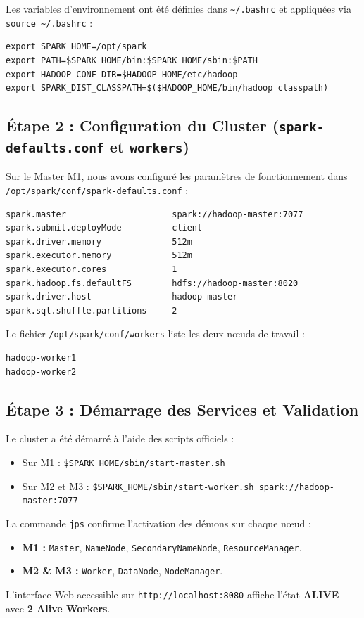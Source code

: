 \documentclass[11pt,a4paper]{article}
\begin{document}
Les variables d'environnement ont été définies dans \texttt{\textasciitilde/.bashrc} et appliquées via \texttt{source \textasciitilde/.bashrc} :
\begin{lstlisting}[style=custombash]
export SPARK_HOME=/opt/spark
export PATH=$SPARK_HOME/bin:$SPARK_HOME/sbin:$PATH
export HADOOP_CONF_DIR=$HADOOP_HOME/etc/hadoop
export SPARK_DIST_CLASSPATH=$($HADOOP_HOME/bin/hadoop classpath)
\end{lstlisting}

\subsection{Étape 2 : Configuration du Cluster (\texttt{spark-defaults.conf} et \texttt{workers})}
Sur le Master M1, nous avons configuré les paramètres de fonctionnement dans \texttt{/opt/spark/conf/spark-defaults.conf} :
\begin{lstlisting}[style=custombash]
spark.master                     spark://hadoop-master:7077
spark.submit.deployMode          client
spark.driver.memory              512m
spark.executor.memory            512m
spark.executor.cores             1
spark.hadoop.fs.defaultFS        hdfs://hadoop-master:8020
spark.driver.host                hadoop-master
spark.sql.shuffle.partitions     2
\end{lstlisting}

Le fichier \texttt{/opt/spark/conf/workers} liste les deux nœuds de travail :
\begin{lstlisting}[style=custombash]
hadoop-worker1
hadoop-worker2
\end{lstlisting}

\subsection{Étape 3 : Démarrage des Services et Validation}
Le cluster a été démarré à l'aide des scripts officiels :
\begin{itemize}
    \item Sur M1 : \texttt{\$SPARK\_HOME/sbin/start-master.sh}
    \item Sur M2 et M3 : \texttt{\$SPARK\_HOME/sbin/start-worker.sh spark://hadoop-master:7077}
\end{itemize}

La commande \texttt{jps} confirme l'activation des démons sur chaque nœud :
\begin{itemize}
    \item \textbf{M1 :} \texttt{Master}, \texttt{NameNode}, \texttt{SecondaryNameNode}, \texttt{ResourceManager}.
    \item \textbf{M2 \& M3 :} \texttt{Worker}, \texttt{DataNode}, \texttt{NodeManager}.
\end{itemize}
L'interface Web accessible sur \texttt{http://localhost:8080} affiche l'état \textbf{ALIVE} avec \textbf{2 Alive Workers}.
\end{document}
